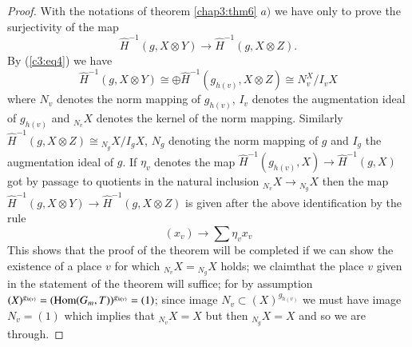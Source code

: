 \begin{proof}
With the notations of theorem \ref{chap3:thm6} $a)$ we have only to prove the
surjectivity of the map 
$$
\hat{H}^{-1}(g, X \otimes Y) \longrightarrow \hat{H}^{-1}(g, X \otimes 
Z). 
$$
By (\ref{c3:eq4}) we have
$$
\hat{H}^{-1}(g, X \otimes Y) \cong \oplus \hat{H}^{-1}(g_{h(v)}, X
\otimes Z) \cong N^X_v / I_v X 
$$
where $N_v$ denotes the norm mapping of $g_{h(v)}$, $I_v$ denotes the
augmentation ideal of $g_{h(v)}$ and ${}_{N_v} X$ denotes the kernel of the
norm mapping. Similarly $\hat{H}^{-1}(g, X \otimes Z) \cong {}_{N_g}X /
I_g X$, $N_g$ denoting the norm mapping of $g$  and $I_g$ the
augmentation ideal of $g$. If $\eta_v$ denotes the map
$\hat{H}^{-1}(g_{h(v)}, X ) \rightarrow \hat{H}^{-1}(g, X )$ got by
passage to quotients in the natural inclusion ${}_{N_v}X \rightarrow{}_{N_g}
X$ then the map $\hat{H}^{-1}(g, X \otimes Y) \rightarrow
\hat{H}^{-1}(g, X \otimes Z)$ is given after the above identification
by the rule 
$$
(x_v) \rightarrow \sum \eta_v x_v
$$
This shows that the proof of the theorem will be completed if we can
show the existence of a place $v$ for which ${}_{N_v} X = {}_{N_g} X$ holds; we
claim\pageoriginale that the place $v$ given in the statement of the
theorem will suffice; for by assumption $(X)^{g_{h(v)}} = (\operatorname{Hom}(G_m
,T))^{g_{h(v)}} = (1)$; since image $N_v \subset (X)^{g_{h(v)}}$ we
must have image $N_v = (1)$ which implies that ${}_{N_v} X =X$ but then
${}_{N_g}X=X$ and so we are through.  
\end{proof}

